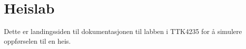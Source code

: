 \chapter{Heislab}
\hypertarget{index}{}\label{index}
\label{index_md_README}%
%
 Dette er landingssiden til dokumentasjonen til labben i TTK4235 for å simulere oppførselen til en heis.

 